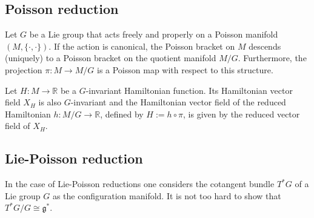 \subsection{Poisson reduction}


    \begin{theorem}
        Let $G$ be a Lie group that acts freely and properly on a Poisson manifold $(M,\{\cdot,\cdot\})$. If the action is canonical, the Poisson bracket on $M$ descends (uniquely) to a Poisson bracket on the quotient manifold $M/G$. Furthermore, the projection $\pi:M\rightarrow M/G$ is a Poisson map with respect to this structure.
    \end{theorem}
    \begin{property}
        Let $H:M\rightarrow\mathbb{R}$ be a $G$-invariant Hamiltonian function. Its Hamiltonian vector field $X_H$ is also $G$-invariant and the Hamiltonian vector field of the reduced Hamiltonian $h:M/G\rightarrow\mathbb{R}$, defined by $H:=h\circ\pi$, is given by the reduced vector field of $X_H$.
    \end{property}

\subsection{Lie-Poisson reduction}

    In the case of Lie-Poisson reductions one considers the cotangent bundle $T^*G$ of a Lie group $G$ as the configuration manifold. It is not too hard to show that $T^*G/G\cong\mathfrak{g}^*$.

